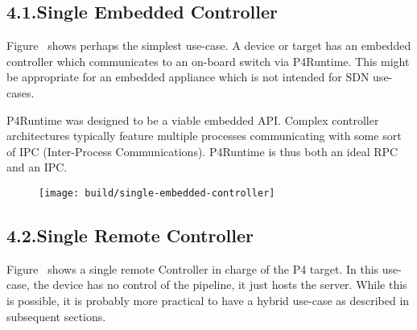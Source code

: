 \documentclass[11pt]{article}
\begin{document}
{%
\subsection{4.1.\hspace*{0.5em}Single Embedded Controller}\label{sec-single-embedded-controller}%

\noindent{}Figure~ shows perhaps the simplest use-case. A
device or target has an embedded controller which communicates to an on-board
switch via P4Runtime. This might be appropriate for an embedded appliance which
is not intended for SDN use-cases.%

P4Runtime was designed to be a viable embedded API. Complex controller
architectures typically feature multiple processes communicating with some sort
of IPC (Inter-Process Communications). P4Runtime is thus both an ideal RPC and
an IPC.%

\begin{figure}[tbp]%
\begin{mdcenter}%

\noindent{}\texttt{[image: build/single-embedded-controller]}{}%

\mdhr{}%

\noindent{}%
\end{mdcenter}\label{fig-single-embedded-controller}%
\end{figure}%

\subsection{4.2.\hspace*{0.5em}Single Remote Controller}\label{sec-single-remote-controller}%

\noindent{}Figure~ shows a single remote Controller in
charge of the P4 target. In this use-case, the device has no control of the
pipeline, it just hosts the server. While this is possible, it is probably more
practical to have a hybrid use-case as described in subsequent sections.%

}
\end{document}
